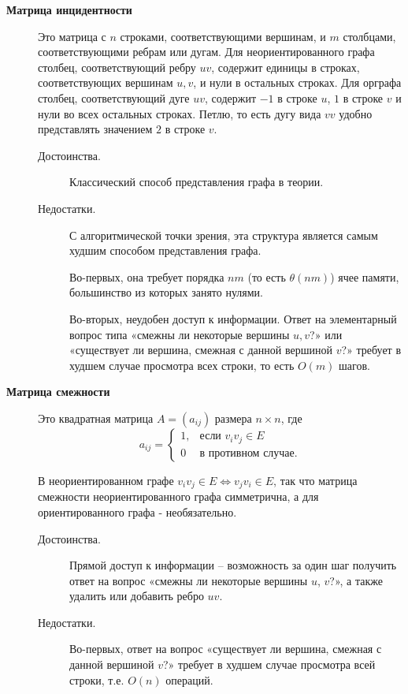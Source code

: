 \begin{note}\leavevmode
    \begin{description}

        \item[ \textbf{Матрица инцидентности}]
              Это матрица с $ n $ строками, соответствующими вершинам, и $ m $ столбцами, соответствующими ребрам или дугам. Для неориентированного графа столбец, соответствующий ребру $ uv $, содержит единицы в строках, соответствующих вершинам $ u,v $, и нули в остальных строках. Для орграфа столбец, соответствующий дуге $ uv $, содержит $ -1 $ в строке $ u $, $ 1 $ в строке $ v $ и нули во всех остальных строках. Петлю, то есть дугу вида $ vv $ удобно представлять значением $ 2 $ в строке $ v $.

              \begin{description}
                  \item[Достоинства.] Классический способ представления графа в теории.
                  \item[Недостатки.] С алгоритмической точки зрения, эта структура является самым худшим способом представления графа.

                        Во-первых, она требует порядка $ nm $ (то есть $ \theta(nm) $) ячее памяти, большинство из которых занято нулями.

                        Во-вторых, неудобен доступ к информации. Ответ на элементарный вопрос типа «смежны ли некоторые вершины $ u,v $?» или «существует ли вершина, смежная с данной вершиной $ v $?» требует в худшем случае просмотра всех строки, то есть $ O(m) $ шагов.
              \end{description}

        \item[ \textbf{Матрица смежности}]
              Это квадратная матрица $ A = (a_{ij}) $ размера $ n \times n $, где
              \[
                  a_{ij} = \left\{\begin{array}{ll}
                      1, & \text{если } v_iv_j \in E  \\
                      0  & \text{в противном случае.}
                  \end{array}\right.
              \]

              В неориентированном графе $ v_iv_j \in E \iff v_jv_i \in E $, так что матрица смежности неориентированного графа симметрична, а для ориентированного графа - необязательно.
              \begin{description}
                  \item[Достоинства.] Прямой доступ к информации – возможность за один шаг получить ответ на вопрос «смежны ли некоторые вершины $ u $, $ v $?», а также удалить или добавить ребро $ uv $.
                  \item[Недостатки.]
                        Во-первых, ответ на вопрос «существует ли вершина, смежная с данной вершиной $ v $?» требует в худшем случае просмотра всей строки, т.е. $ O(n) $ операций.


\end{description}
\end{description}
\end{note}
